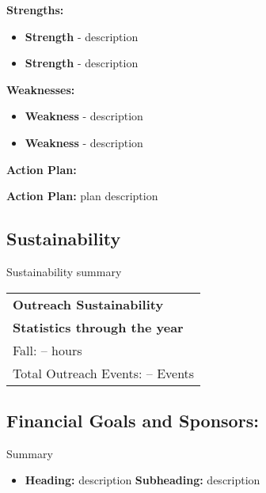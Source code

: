 \textbf{Strengths:} 
\begin{itemize}
\item \textbf{Strength} - description
\item \textbf{Strength} - description
\end{itemize}

\textbf{Weaknesses:} 
\begin{itemize}
\item \textbf{Weakness} - description
\item \textbf{Weakness} - description
\end{itemize}


\textbf{\Large Action Plan:}

\textbf{Action Plan:} plan description

\subsection*{\textbf{\Huge Sustainability}}

Sustainability summary

\begin{table}[ht!]
\centering
\label{outreachsustainability}
\begin{tabular}{ 
>{\columncolor[HTML]{E1E1E1}}l 
}
\cellcolor[HTML]{C9C9C9}\textbf{Outreach Sustainability}         \\ 
\textbf{Statistics through the year}      \\
Fall: -- hours                    \\
Total Outreach Events:  -- Events                    \\
\end{tabular}
\end{table} 

\subsection*{\textbf{\Huge Financial Goals and Sponsors:}}
\vspace{.2cm}
\setlength{\parindent}{.25in} 

Summary

\begin{itemize}
  \item \textbf{\Large Heading:}
  \newline 
   description
  \newline 
\textbf{Subheading:} description


  
\end{itemize}

